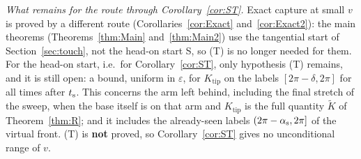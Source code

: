 \begin{remark}[Status]
\emph{What remains for the route through Corollary~\ref{cor:ST}.} Exact capture at small $v$ is proved by a different route
(Corollaries~\ref{cor:Exact} and~\ref{cor:Exact2}): the main theorems (Theorems~\ref{thm:Main} and~\ref{thm:Main2}) use the tangential start of Section~\ref{sec:touch}, not
the head-on start S, so \textup{(T)} is no longer needed for them. For the head-on start, i.e.\ for Corollary~\ref{cor:ST}, only
hypothesis \textup{(T)} remains, and it is still open: a bound, uniform in
$\varepsilon$, for $K_{\mathrm{tip}}$ on the labels $[2\pi-\delta,2\pi]$ for all times after $t_{\mathrm s}$. This concerns the arm left behind,
including the final stretch of the sweep, when the base itself is on that arm and $K_{\mathrm{tip}}$ is the full quantity
$\tilde K$ of Theorem~\ref{thm:R}; and it includes the already-seen labels $(2\pi-\alpha_{\mathrm s},2\pi]$ of the virtual front. \textup{(T)} is
\textbf{not} proved, so Corollary~\ref{cor:ST} gives no unconditional range of $v$.
\end{remark}
